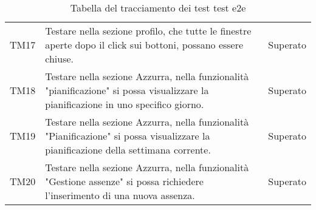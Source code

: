 \begin{table}[h]
\begin{tabularx}{\textwidth}{c X c}
		TM17 & Testare nella sezione profilo, che tutte le finestre aperte dopo il click sui bottoni, possano essere chiuse. & Superato\\
		TM18 & Testare nella sezione Azzurra, nella funzionalità "pianificazione" si possa visualizzare la pianificazione in uno specifico giorno. & Superato\\
		TM19 & Testare nella sezione Azzurra, nella funzionalità "Pianificazione" si possa visualizzare la pianificazione della settimana corrente. & Superato\\
		TM20 & Testare nella sezione Azzurra, nella funzionalità "Gestione assenze" si possa richiedere l'inserimento di una nuova assenza. & Superato\\
	\end{tabularx} \hbox{}
	\caption{Tabella del tracciamento dei test \gls{test e2e}}
\end{table}%

